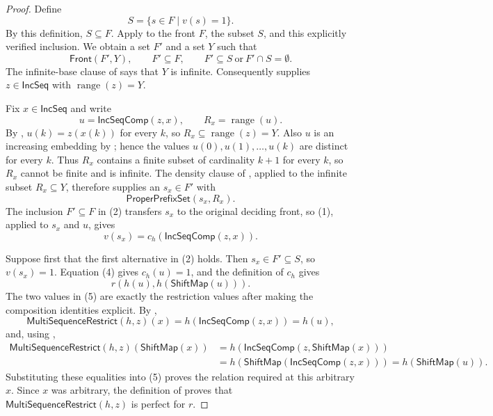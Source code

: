 \begin{proof}
Define
\[
 S=\{s\in F\mid v(s)=1\}.
\]
By this definition, $S\subseteq F$.  Apply  to the
front $F$, the subset $S$, and this explicitly verified inclusion.  We
obtain a set $F'$ and a set $Y$ such that
\[
 \mathsf{Front}(F',Y),\qquad F'\subseteq F,
 \qquad F'\subseteq S\ \text{or}\ F'\cap S=\emptyset.
 \tag{2}
\]
The infinite-base clause of  says that $Y$ is infinite.
Consequently  supplies
$z\in\mathsf{IncSeq}$ with
$\operatorname{range}(z)=Y$.

Fix $x\in\mathsf{IncSeq}$ and write
\[
 u=\mathsf{IncSeqComp}(z,x),
 \qquad R_x=\operatorname{range}(u).
\]
By , $u(k)=z(x(k))$ for every $k$, so
$R_x\subseteq\operatorname{range}(z)=Y$.  Also $u$ is an increasing
embedding by ; hence the values
$u(0),u(1),\ldots,u(k)$ are distinct for every $k$.  Thus $R_x$ contains
a finite subset of cardinality $k+1$ for every $k$, so $R_x$ cannot be
finite and is infinite.
The density clause of , applied to the infinite subset
$R_x\subseteq Y$, therefore supplies an $s_x\in F'$ with
\[
 \mathsf{ProperPrefixSet}(s_x,R_x).
 \tag{3}
\]
The inclusion $F'\subseteq F$ in (2) transfers $s_x$ to the original
deciding front, so (1), applied to $s_x$ and $u$, gives
\[
 v(s_x)=c_h(\mathsf{IncSeqComp}(z,x)).
 \tag{4}
\]

Suppose first that the first alternative in (2) holds.  Then
$s_x\in F'\subseteq S$, so $v(s_x)=1$.  Equation (4) gives
$c_h(u)=1$, and the definition of $c_h$ gives
\[
 r(h(u),h(\mathsf{ShiftMap}(u))).
 \tag{5}
\]
The two values in (5) are exactly the restriction values after making the
composition identities explicit.  By ,
\[
 \mathsf{MultiSequenceRestrict}(h,z)(x)=h(\mathsf{IncSeqComp}(z,x))=h(u),
\]
and, using ,
\[
\begin{aligned}
 \mathsf{MultiSequenceRestrict}(h,z)(\mathsf{ShiftMap}(x))
 &=h(\mathsf{IncSeqComp}(z,\mathsf{ShiftMap}(x)))\\
 &=h(\mathsf{ShiftMap}(\mathsf{IncSeqComp}(z,x)))
  =h(\mathsf{ShiftMap}(u)).
\end{aligned}
\]
Substituting these equalities into (5) proves the relation required at this
arbitrary $x$.  Since $x$ was arbitrary, the definition of
 proves that
$\mathsf{MultiSequenceRestrict}(h,z)$ is perfect for $r$.


\end{proof}
